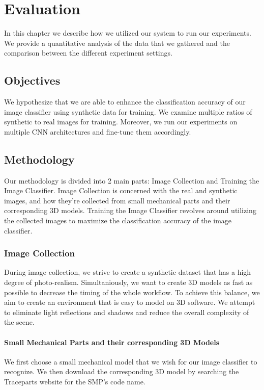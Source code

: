 \chapter{Evaluation}

In this chapter we describe how we utilized our system to run our experiments. We provide a quantitative analysis of the data that we gathered and the comparison between the different experiment settings.

\section{Objectives}

We hypothesize that we are able to enhance the classification accuracy of our image classifier using synthetic data for training. We examine multiple ratios of synthetic to real images for training. Moreover, we run our experiments on multiple CNN architectures and fine-tune them accordingly.


\section{Methodology}

Our methodology is divided into 2 main parts: Image Collection and Training the Image Classifier. Image Collection is concerned with the real and synthetic images, and how they're collected from small mechanical parts and their corresponding 3D models. Training the Image Classifier revolves around utilizing the collected images to maximize the classification accuracy of the image classifier.

\subsection{Image Collection}

During image collection, we strive to create a synthetic dataset that has a high degree of photo-realism. Simultaniously, we want to create 3D models as fast as possible to decrease the timing of the whole workflow. To achieve this balance, we aim to create an environment that is easy to model on 3D software. We attempt to eliminate light reflections and shadows and reduce the overall complexity of the scene.

\subsubsection{Small Mechanical Parts and their corresponding 3D Models}
We first choose a small mechanical model that we wish for our image classifier to recognize. We then download the corresponding 3D model by searching the Traceparts website \cite{traceparts} for the SMP's code name.

